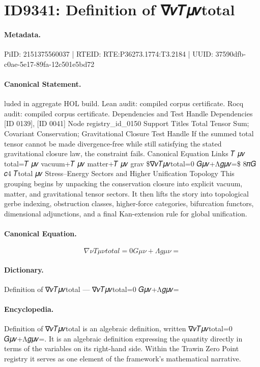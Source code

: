 \section*{ID9341: Definition of ∇𝜈𝑇𝜇𝜈total}
\paragraph{Metadata.}
PiID: 2151375560037 | RTEID: RTE:P36273.1774:T3.2184 | UUID: 37590dfb-c0ae-5e17-89fa-12c501e5bd72

\paragraph{Canonical Statement.}
luded in aggregate HOL build. Lean audit: compiled corpus certificate. Rocq audit: compiled corpus certificate. Dependencies and Test Handle Dependencies [ID 0139], [ID 0041] Node registry\_id\_0150 Support Titles Total Tensor Sum; Covariant Conservation; Gravitational Closure Test Handle If the summed total tensor cannot be made divergence-free while still satisfying the stated gravitational closure law, the constraint fails. Canonical Equation Links 𝑇 𝜇𝜈 total=𝑇 𝜇𝜈 vacuum+𝑇 𝜇𝜈 matter+𝑇 𝜇𝜈 grav \$∇𝜈𝑇𝜇𝜈total=0 𝐺𝜇𝜈+Λ𝑔𝜇𝜈=\$ 8𝜋𝐺 𝑐4 𝑇total 𝜇𝜈 Stress–Energy Sectors and Higher Unification Topology This grouping begins by unpacking the conservation closure into explicit vacuum, matter, and gravitational tensor sectors. It then lifts the story into topological gerbe indexing, obstruction classes, higher-force categories, bifurcation functors, dimensional adjunctions, and a final Kan-extension rule for global unification.

\paragraph{Canonical Equation.}
\[
∇𝜈𝑇𝜇𝜈total=0 𝐺𝜇𝜈+Λ𝑔𝜇𝜈=
\]

\paragraph{Dictionary.}
Definition of ∇𝜈𝑇𝜇𝜈total — ∇𝜈𝑇𝜇𝜈total=0 𝐺𝜇𝜈+Λ𝑔𝜇𝜈=

\paragraph{Encyclopedia.}
Definition of ∇𝜈𝑇𝜇𝜈total is an algebraic definition, written ∇𝜈𝑇𝜇𝜈total=0 𝐺𝜇𝜈+Λ𝑔𝜇𝜈=. It is an algebraic definition expressing the quantity directly in terms of the variables on its right-hand side. Within the Trawin Zero Point registry it serves as one element of the framework's mathematical narrative.
